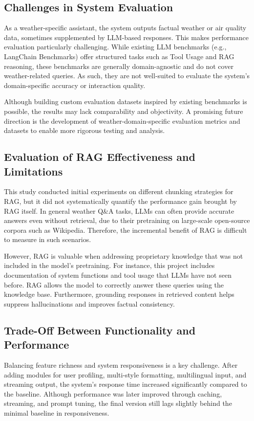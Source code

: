 \documentclass[final-report]{report-template}
\begin{document}
\subsection{Challenges in System Evaluation}

As a weather-specific assistant, the system outputs factual weather or air quality data, sometimes supplemented by LLM-based responses. This makes performance evaluation particularly challenging. While existing LLM benchmarks (e.g., LangChain Benchmarks) offer structured tasks such as Tool Usage and RAG reasoning, these benchmarks are generally domain-agnostic and do not cover weather-related queries. As such, they are not well-suited to evaluate the system’s domain-specific accuracy or interaction quality.

Although building custom evaluation datasets inspired by existing benchmarks is possible, the results may lack comparability and objectivity. A promising future direction is the development of weather-domain-specific evaluation metrics and datasets to enable more rigorous testing and analysis.

\subsection{Evaluation of RAG Effectiveness and Limitations}

This study conducted initial experiments on different chunking strategies for RAG, but it did not systematically quantify the performance gain brought by RAG itself. In general weather Q\&A tasks, LLMs can often provide accurate answers even without retrieval, due to their pretraining on large-scale open-source corpora such as Wikipedia. Therefore, the incremental benefit of RAG is difficult to measure in such scenarios.

However, RAG is valuable when addressing proprietary knowledge that was not included in the model's pretraining. For instance, this project includes documentation of system functions and tool usage that LLMs have not seen before. RAG allows the model to correctly answer these queries using the knowledge base. Furthermore, grounding responses in retrieved content helps suppress hallucinations and improves factual consistency.

\subsection{Trade-Off Between Functionality and Performance}

Balancing feature richness and system responsiveness is a key challenge. After adding modules for user profiling, multi-style formatting, multilingual input, and streaming output, the system’s response time increased significantly compared to the baseline. Although performance was later improved through caching, streaming, and prompt tuning, the final version still lags slightly behind the minimal baseline in responsiveness.
\end{document}

